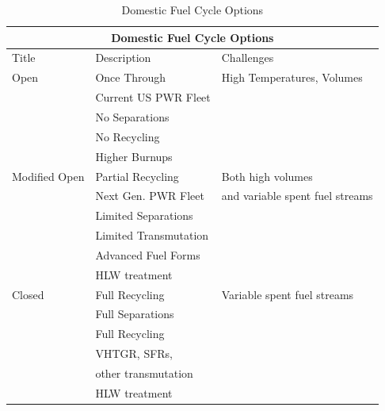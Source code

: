 \begin{table}
  \centering
  \footnotesize{
    \begin{tabular}{|l|l|l|}
      \multicolumn{3}{c}{\textbf{Domestic Fuel Cycle Options}}                \\
      \hline
      Title         & Description           & Challenges                      \\
      \hline
      \hline
      Open          & Once Through          & High Temperatures, Volumes      \\
                    & Current US PWR Fleet  &                                 \\
                    & No Separations        &                                 \\
                    & No Recycling          &                                 \\
                    & Higher Burnups        &                                 \\
      \hline
      Modified Open & Partial Recycling     & Both high volumes               \\
                    & Next Gen. PWR Fleet   & and variable spent fuel streams \\
                    & Limited Separations   &                                 \\
                    & Limited Transmutation &                                 \\
                    & Advanced Fuel Forms   &                                 \\
                    & HLW treatment         &                                 \\
      \hline
      Closed        & Full Recycling        & Variable spent fuel streams     \\
                    & Full Separations      &                                 \\
                    & Full Recycling        &                                 \\
                    & VHTGR, SFRs,          &                                 \\
                    & other transmutation   &                                 \\
                    & HLW treatment         &                                 \\
      \hline
    \end{tabular}
    \caption[Fuel Cycle Options]{Domestic Fuel Cycle Options }
    \label{tab:fco}
  }
\end{table}
